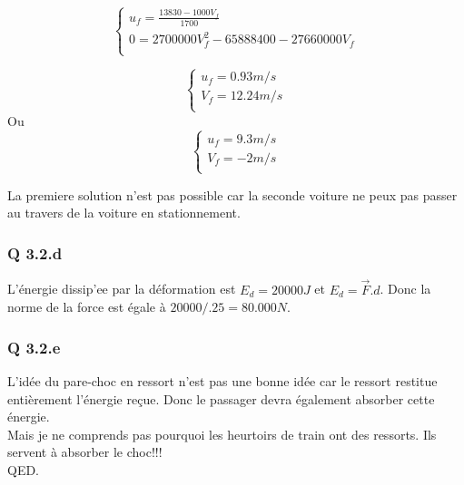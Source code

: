 \documentclass[]{book}
\theoremstyle{definition}
\begin{document}
$$
\left\{ 
\begin{array}{l}
 u_f = \frac{13830 - 1000V_f}{1700}\\
 0 = 2700000V_f^2 -65888400 - 27660000V_f \\
\end{array}
\right. 
$$

$$
\left\{ 
\begin{array}{l}
 u_f = 0.93m/s\\
 V_f = 12.24m/s \\
\end{array}
\right. 
$$
Ou
$$
\left\{ 
\begin{array}{l}
 u_f = 9.3m/s\\
 V_f = -2m/s \\
\end{array}
\right. 
$$

La premiere solution n'est pas possible car la seconde voiture ne peux pas passer au travers de la voiture en stationnement.

\subsubsection*{Q 3.2.d}
L'\'energie dissip'ee par la d\'eformation est $E_d = 20000J$ et $E_d = \overrightarrow{F}.d$. Donc la norme de la force est \'egale \`a $20000/.25 = 80.000N$.

\subsubsection*{Q 3.2.e}
 L'id\'ee du pare-choc en ressort n'est pas une bonne id\'ee car le ressort restitue enti\`erement l'\'energie re\c{c}ue. Donc le passager devra \'egalement absorber cette \'energie.\\
 Mais je ne comprends pas pourquoi les heurtoirs de train ont des ressorts. Ils servent \`a absorber le choc!!!\\
 
 
 
QED.
\end{document}
